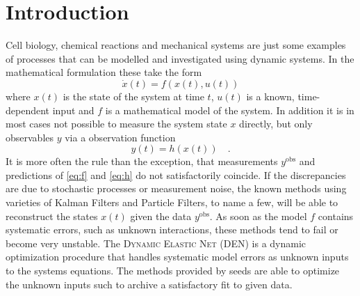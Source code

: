 \section{Introduction}
Cell biology, chemical reactions and mechanical systems are just some examples of 
processes that can be modelled and investigated using dynamic systems. In the mathematical 
formulation these take the form
\begin{equation}
	\dot{x}(t) = f\left(x(t),u(t)\right) \label{eq:f}
\end{equation}
where $x(t)$ is the state of the system at time $t$, $u(t)$ is a known, time-dependent input and 
$f$ is a mathematical model of the system. In addition it is in most cases not possible 
to measure the system state $x$ directly, but only observables $y$ via a observation function 
\begin{equation}
y(t) = h\left(x(t)\right) \quad . \label{eq:h}
\end{equation}
It is more often the rule than the exception, that measurements $y^\text{obs}$ and predictions 
of \eqref{eq:f} and \eqref{eq:h} do not satisfactorily coincide. If the discrepancies are due 
to stochastic processes or measurement noise, the known methods using varieties of Kalman 
Filters and Particle Filters, to name a few, will be able to reconstruct the states $x(t)$ 
given the data $y^\text{obs}$. As soon as the model $f$ contains systematic errors, such as 
unknown interactions, these methods tend to fail or become very unstable. The \textsc{Dynamic 
Elastic Net} (DEN)\cite{DEN} is a dynamic optimization procedure that handles systematic model 
errors as unknown inputs to the systems equations. The methods provided by \textsf{seeds} are 
able to optimize the unknown inputs such to archive a satisfactory fit to given data. 